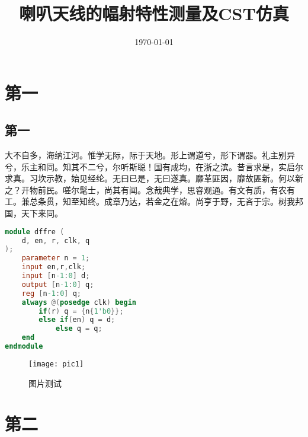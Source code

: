 \documentclass{source/Report}
\title{喇叭天线的幅射特性测量及CST仿真}
\date{\today}
\begin{document}
    \makecover
    \makeheader
    \section{第一}
        \subsection{第一}
            大不自多，海纳江河。惟学无际，际于天地。形上谓道兮，形下谓器。礼主别异兮，乐主和同。知其不二兮，尔听斯聪！国有成均，在浙之滨。昔言求是，实启尔求真。习坎示教，始见经纶。无曰已是，无曰遂真。靡革匪因，靡故匪新。何以新之？开物前民。嗟尔髦士，尚其有闻。念哉典学，思睿观通。有文有质，有农有工。兼总条贯，知至知终。成章乃达，若金之在熔。尚亨于野，无吝于宗。树我邦国，天下来同。

            

            \begin{lstlisting}[language = Verilog, title = {代码块测试（直接插入）}]
module dffre (
    d, en, r, clk, q
);
    parameter n = 1;
    input en,r,clk;
    input [n-1:0] d;
    output [n-1:0] q;
    reg [n-1:0] q;
    always @(posedge clk) begin
        if(r) q = {n{1'b0}};
        else if(en) q = d;
            else q = q;
    end
endmodule
            \end{lstlisting}

            \begin{figure}[H]
                \centering
                \texttt{[image: pic1]}
                \caption{图片测试}
            \end{figure}


    \section{第二}
\end{document}
